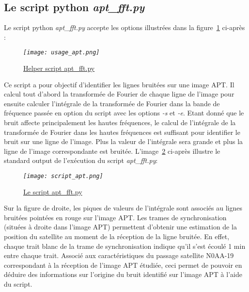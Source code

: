 \documentclass[12pt,fleqn]{book} %
\begin{document}
\subsection{Le script python \emph{apt\_fft.py}}
Le script python \emph{apt\_fft.py} accepte les options illustrées dans la figure~\underline{\color{blue}\ref{usage_apt}} ci-après :
\begin{figure}[H]
	\centering
	\itshape
	\texttt{[image: usage\_apt.png]}
	\caption{\label{usage_apt} \underline{Helper script apt\_fft.py}}
\end{figure}
\noindent Ce script a pour objectif d'identifier les lignes bruitées sur une image APT. Il calcul tout d'abord la transformée de Fourier de chaque ligne de l'image pour ensuite calculer l'intégrale de la transformée de Fourier dans la bande de fréquence passée en option du script avec les options \emph{-s} et \emph{-e}.
Etant donné que le bruit affecte principalement les hautes fréquences, le calcul de l'intégrale de la transformée de Fourier dans les hautes fréquences est suffisant pour identifier le bruit sur une ligne de l'image. Plus la valeur de l'intégrale sera grande et plus la ligne de l'image correspondante est bruitée.
L'image~\underline{\color{blue}\ref{script_apt}} ci-après illustre le standard output de l'exécution du script \emph{apt\_fft.py}:
\begin{figure}[H]
	\centering
	\itshape
	\texttt{[image: script\_apt.png]}
	\caption{\label{script_apt} \underline{Le script apt\_fft.py}}
\end{figure}
\noindent Sur la figure de droite, les piques de valeurs de l'intégrale sont associés au lignes bruitées pointées en rouge sur l'image APT. Les trames de synchronisation (situées à droite dans l'image APT) permettent d'obtenir une estimation de la position du satellite au moment de la réception de la ligne bruitée.
En effet, chaque trait blanc de la trame de synchronisation indique qu'il s'est écoulé 1 min entre chaque trait. Associé aux caractéristiques du passage satellite N0AA-19 correspondant à la réception de l'image APT étudiée, ceci permet de pouvoir en déduire des informations sur l'origine du bruit identifié sur l'image APT à l'aide du script. 
\end{document}
